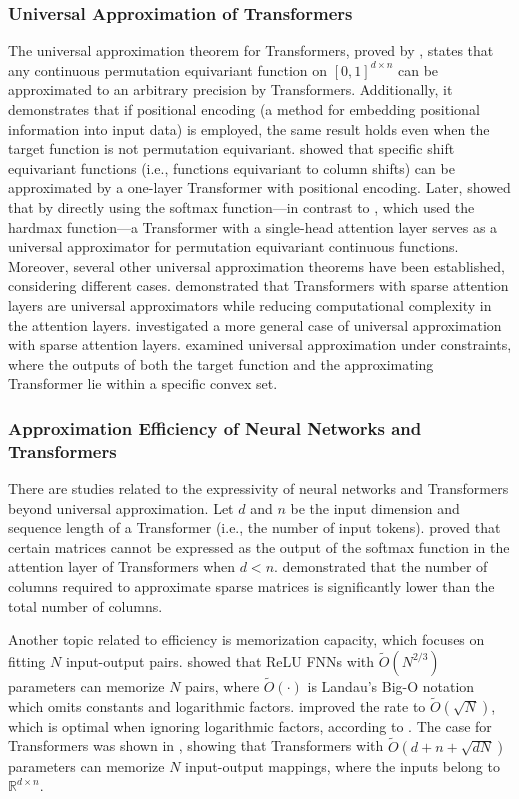 \subsubsection{Universal Approximation of Transformers}
The universal approximation theorem for Transformers, proved by \cite{Yun19}, states that any continuous permutation equivariant function on $[0,1]^{d \times n}$ can be approximated to an arbitrary precision by Transformers. Additionally, it demonstrates that if positional encoding (a method for embedding positional information into input data) is employed, the same result holds even when the target function is not permutation equivariant. \cite{Tak23} showed that specific shift equivariant functions (i.e., functions equivariant to column shifts) can be approximated by a one-layer Transformer with positional encoding. Later, \cite{Kaj24} showed that by directly using the softmax function—in contrast to \cite{Yun19}, which used the hardmax function—a Transformer with a single-head attention layer serves as a universal approximator for permutation equivariant continuous functions. Moreover, several other universal approximation theorems have been established, considering different cases. \cite{Zah20} demonstrated that Transformers with sparse attention layers are universal approximators while reducing computational complexity in the attention layers. \cite{Yun20} investigated a more general case of universal approximation with sparse attention layers. \cite{Kra22} examined universal approximation under constraints, where the outputs of both the target function and the approximating Transformer lie within a specific convex set.

\subsubsection{Approximation Efficiency of Neural Networks and Transformers}

There are studies related to the expressivity of neural networks and Transformers beyond universal approximation.
Let $d$ and $n$ be the input dimension and sequence length of a Transformer (i.e., the number of input tokens).
\cite{Bho20} proved that certain matrices cannot be expressed as the output of the softmax function in the attention layer of Transformers when $d < n$.
\cite{Lik21} demonstrated that the number of columns required to approximate sparse matrices is significantly lower than the total number of columns.

Another topic related to efficiency is memorization capacity, which focuses on fitting $N$ input-output pairs.
\cite{Par21} showed that ReLU FNNs with $\tilde{O}(N^{2/3})$ parameters can memorize $N$ pairs, where $\tilde{O}(\cdot)$ is Landau's Big-O notation which omits constants and logarithmic factors.
\cite{Var22} improved the rate to $\tilde{O} (\sqrt{N})$, which is optimal when ignoring logarithmic factors, according to \cite{Gol93}.
The case for Transformers was shown in \cite{Kim23}, showing that Transformers with $\tilde{O} (d + n + \sqrt{dN})$ parameters can memorize $N$ input-output mappings, where the inputs belong to $\mathbb{R}^{d\times n}$.